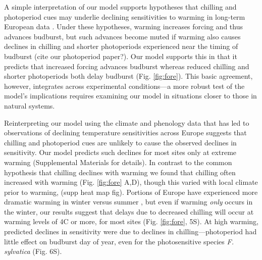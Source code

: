 \documentclass{article}
\begin{document}
\par A simple interpretation of our model supports hypotheses that chilling and photoperiod cues may underlie declining sensitivities to warming in long-term European data \citep{Rutishauser:2008,yu2010,fu2015}. Under these hypotheses, warming increases forcing and thus advances budburst, but such advances become muted if warming also causes declines in chilling and shorter photoperiods experienced near the timing of budburst (cite our photoperiod paper?)\citep{koerner2010a}. Our model supports this in that it predicts that increased forcing advances budburst whereas reduced chilling and shorter photoperiods both delay budburst (Fig. \ref{fig:fore}). This basic agreement, however, integrates across experimental conditions---a more robust test of the model's implications requires examining our model in situations closer to those in natural systems.

\par Reinterpreting our model using the climate and phenology data that has led to observations of declining temperature sensitivities across Europe suggests that chilling and photoperiod cues are unlikely to cause the observed declines in sensitivity. Our model predicts such declines for most sites only at extreme warming (Supplemental Materials for details). In contrast to the common hypothesis that chilling declines with warming we found that chilling often increased with warming (Fig. \ref{fig:fore} A,D), though this varied with local climate prior to warming, (supp heat map fig). Portions of Europe have experienced more dramatic warming in winter versus summer \cite{balling1998}, but even if warming \emph{only} occurs in the winter, our results suggest that delays due to decreased chilling will occur at warming levels of 4\degree C or more, for most sites (Fig. \ref{fig:fore}, 5S). At high warming, predicted declines in sensitivity were due to declines in chilling---photoperiod had little effect on budburst day of year, even for the photosensitive species \emph{F. sylvatica} (Fig. 6S). %
\end{document}

